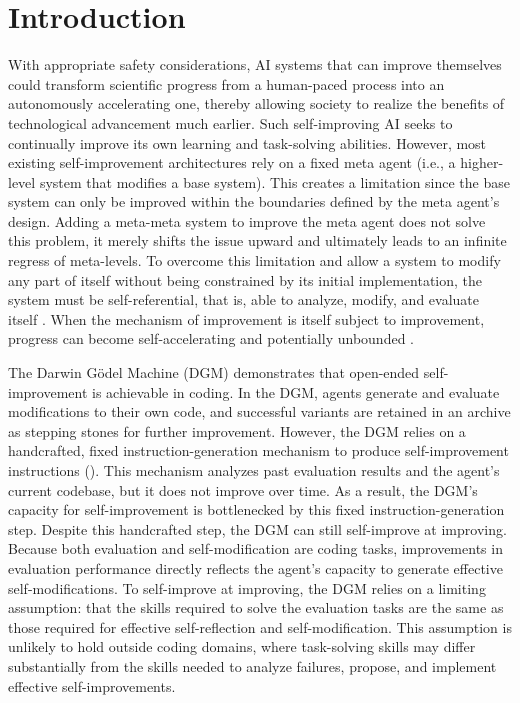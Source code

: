 \documentclass[]{fairmeta}
\title{{\ha}}
\author[1,2\dagger]{Jenny Zhang}
\author[3\dagger]{Bingchen Zhao}
\author[4,6]{Wannan Yang}
\author[6]{Jakob Foerster}
\author[\ddagger]{Minqi Jiang}
\author[7]{Sam Devlin}
\author[6]{Tatiana Shavrina}
\affiliation[1]{University of British Columbia}
\affiliation[2]{Vector Institute}
\affiliation[3]{University of Edinburgh}
\affiliation[5]{Canada CIFAR AI Chair}
\affiliation[6]{FAIR at Meta}
\affiliation[7]{Meta Superintelligence Labs}
\date{\today}
\begin{document}
\maketitle

\section{Introduction}
\label{sec:intro}

With appropriate safety considerations, AI systems that can improve themselves could transform scientific progress from a human-paced process into an autonomously accelerating one, thereby allowing society to realize the benefits of technological advancement much earlier. Such self-improving AI seeks to continually improve its own learning and task-solving abilities. However, most existing self-improvement architectures rely on a fixed meta agent (i.e., a higher-level system that modifies a base system). This creates a limitation since the base system can only be improved within the boundaries defined by the meta agent's design. Adding a meta-meta system to improve the meta agent does not solve this problem, it merely shifts the issue upward and ultimately leads to an infinite regress of meta-levels. To overcome this limitation and allow a system to modify any part of itself without being constrained by its initial implementation, the system must be self-referential, that is, able to analyze, modify, and evaluate itself \citep{kirsch2022eliminating, zhang2025darwin}. When the mechanism of improvement is itself subject to improvement, progress can become self-accelerating and potentially unbounded \citep{lu2023arbitrary}.

The Darwin G\"odel Machine (DGM) \citep{zhang2025darwin} demonstrates that open-ended self-improvement is achievable in coding. In the DGM, agents generate and evaluate modifications to their own code, and successful variants are retained in an archive as stepping stones for further improvement. However, the DGM relies on a handcrafted, fixed instruction-generation mechanism to produce self-improvement instructions (). This mechanism analyzes past evaluation results and the agent's current codebase, but it does not improve over time. As a result, the DGM's capacity for self-improvement is bottlenecked by this fixed instruction-generation step. Despite this handcrafted step, the DGM can still self-improve at improving. Because both evaluation and self-modification are coding tasks, improvements in evaluation performance directly reflects the agent's capacity to generate effective self-modifications. To self-improve at improving, the DGM relies on a limiting assumption: that the skills required to solve the evaluation tasks are the same as those required for effective self-reflection and self-modification. This assumption is unlikely to hold outside coding domains, where task-solving skills may differ substantially from the skills needed to analyze failures, propose, and implement effective self-improvements.
\end{document}
